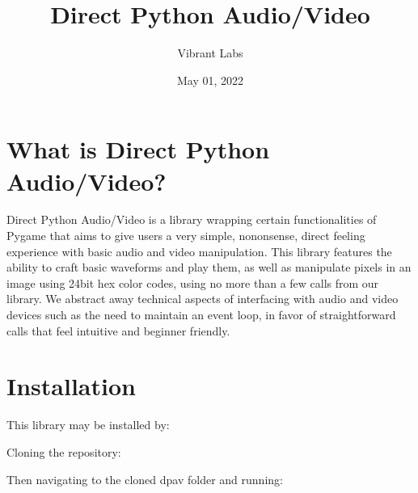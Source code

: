 \documentclass[letterpaper,10pt,english,openany,oneside]{sphinxmanual}
\title{Direct Python Audio/Video}
\date{May 01, 2022}
\author{Vibrant Labs}
\begin{document}
\pagestyle{empty}
\sphinxmaketitle
\pagestyle{plain}
\sphinxtableofcontents
\pagestyle{normal}
\label{\detokenize{index::doc}}



\chapter{What is Direct Python Audio/Video?}
\label{\detokenize{fundamentals:what-is-direct-python-audio-video}}\label{\detokenize{fundamentals::doc}}
\sphinxAtStartPar
Direct Python Audio/Video is a library wrapping certain functionalities of Pygame that aims to give users a very simple, no\sphinxhyphen{}nonsense, direct feeling experience with basic audio and video manipulation. This library features the ability to craft basic waveforms and play them, as well as manipulate pixels in an image using 24\sphinxhyphen{}bit hex color codes, using no more than a few calls from our library. We abstract away technical aspects of interfacing with audio and video devices such as the need to maintain an event loop, in favor of straightforward calls that feel intuitive and beginner friendly.


\chapter{Installation}
\label{\detokenize{fundamentals:installation}}
\sphinxAtStartPar
This library may be installed by:

\sphinxAtStartPar
Cloning the repository:

\begin{sphinxVerbatim}[commandchars=\\\{\}]
  
\end{sphinxVerbatim}

\sphinxAtStartPar
Then navigating to the cloned dpav folder and running:

\begin{sphinxVerbatim}[commandchars=\\\{\}]
  
\end{sphinxVerbatim}
\end{document}
